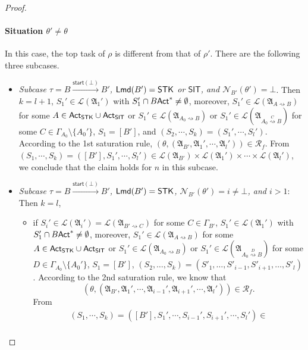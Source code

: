 \documentclass[preprint,12pt]{elsarticle}
\newcommand\act{{\sf Act}}
\newcommand\lmd{{\sf Lmd}}
\newcommand\startactivity{{\mathsf{start} }}
\newcommand\namefun{\mathcal{N}}
\newcommand\AutReach{\mathscr{R}}
\newcommand{\STK}{\mathsf{STK}}
\newcommand{\SIT}{\mathsf{SIT}}
\newcommand\Aut{{\mathfrak{A} }}
\newcommand\Lang{{\mathscr{L} }}
\newcommand\ConfSet{{\mathscr{C} }}
\begin{document}
\begin{proof}
{    \paragraph{Situation $\theta' \neq \theta$}
    In this case, the top task of $\rho$ is different from that of $\rho'$.  There are the following three subcases. 
    \begin{itemize}
        \item \emph{Subcase $\tau = B \xrightarrow{\startactivity(\bot)} B'$, $\lmd(B') = \STK$ or $\SIT$, and $\namefun_{B'}(\theta') = \bot$}. Then $k=l+1$, 
        $S_1'\in\Lang(\Aut_1')$ with $S_1'\cap B\act^*\neq\emptyset$, moreover,
        $S_1' \in \Lang(\Aut_{A\rightsquigarrow B})$ for some $A\in\act_{\STK}\cup\act_{\SIT}$ or $S_1'\in\Lang(\Aut_{A_0\rightsquigarrow B})$ or $S_1'\in\Lang(\Aut_{A_0\stackrel{C}\rightsquigarrow B})$ for some $C\in\Gamma_{A_0}\setminus\{A_0'\}$, 
        $S_1=[B']$, and $(S_2,\cdots,S_k)=(S_1',\cdots,S_l')$.  According to the 1st saturation rule, $(\theta, (\Aut_{B'}, \Aut_1', \cdots, \Aut_l')) \in \AutReach_f$.
       From $(S_1, \cdots, S_k) = ([B'], S_1', \cdots, S_l') \in \Lang(\Aut_{B'}) \times \Lang(\Aut_1') \times \cdots \times \Lang(\Aut_l')$, we conclude that the claim holds for $n$ in this subcase.
        \item \emph{Subcase $\tau = B \xrightarrow{\startactivity(\bot)} B'$, $\lmd(B')=\STK$, $\namefun_{B'}(\theta') = i \neq \bot$, and $i > 1$}: Then $k = l$, 
        \begin{itemize}
            \item if $S_i'\in\Lang(\Aut_i') = \Lang(\Aut_{B'\rightsquigarrow C})$ for some $C\in\Gamma_{B'}$, 
            $S_1'\in\Lang(\Aut_1')$ with $S_1'\cap B\act^*\neq \emptyset$, moreover,
            $S_1' \in \Lang(\Aut_{A\rightsquigarrow B})$ for some $A\in\act_{\STK}\cup\act_{\SIT}$ or $S_1'\in\Lang(\Aut_{A_0\rightsquigarrow B})$ or $S_1'\in\Lang(\Aut_{A_0\stackrel{D}\rightsquigarrow B})$ for some $D\in\Gamma_{A_0}\setminus\{A_0'\}$, 
            $S_1 = [B']$, $(S_2, \dots, S_k) = (S'_1, \dots, S'_{i-1}, S'_{i+1}, \dots, S'_l)$. According to the 2nd saturation rule, we know that 
            $$(\theta, (\Aut_{B'}, \Aut_1',\cdots, \Aut_{i-1}', \Aut_{i+1}', \cdots, \Aut_{l}')) \in \AutReach_f.$$
            From 
            $$
            \begin{array}{l}
                (S_1,\cdots,S_k) = ([B'], S_1', \cdots, S_{i-1}', S_{i+1}', \cdots, S_l') \in \\

\end{array}$$
\end{itemize}
\end{itemize}}
\end{proof}
\end{document}
